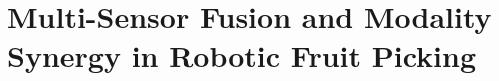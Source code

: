 \documentclass{ieeeaccess}
\begin{document}


\section{Multi-Sensor Fusion and Modality Synergy in Robotic Fruit Picking}
\end{document}
